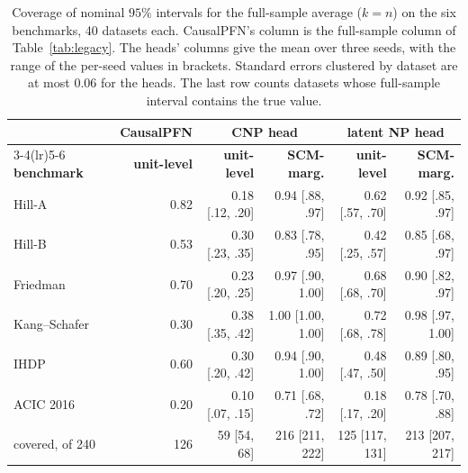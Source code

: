 \begin{table}[tp]
\centering
\footnotesize
\setlength{\tabcolsep}{3pt}
\begin{tabular}{lrrrrr}
\toprule
 & \textbf{CausalPFN} & \multicolumn{2}{c}{\textbf{CNP head}} & \multicolumn{2}{c}{\textbf{latent NP head}} \\
\cmidrule(lr){3-4}\cmidrule(lr){5-6}
\textbf{benchmark} & \textbf{unit-level} & \textbf{unit-level} & \textbf{SCM-marg.} & \textbf{unit-level} & \textbf{SCM-marg.} \\
\midrule
Hill-A & 0.82 & 0.18 {\scriptsize[.12, .20]} & 0.94 {\scriptsize[.88, .97]} & 0.62 {\scriptsize[.57, .70]} & 0.92 {\scriptsize[.85, .97]} \\
Hill-B & 0.53 & 0.30 {\scriptsize[.23, .35]} & 0.83 {\scriptsize[.78, .95]} & 0.42 {\scriptsize[.25, .57]} & 0.85 {\scriptsize[.68, .97]} \\
Friedman & 0.70 & 0.23 {\scriptsize[.20, .25]} & 0.97 {\scriptsize[.90, 1.00]} & 0.68 {\scriptsize[.68, .70]} & 0.90 {\scriptsize[.82, .97]} \\
Kang--Schafer & 0.30 & 0.38 {\scriptsize[.35, .42]} & 1.00 {\scriptsize[1.00, 1.00]} & 0.72 {\scriptsize[.68, .78]} & 0.98 {\scriptsize[.97, 1.00]} \\
IHDP & 0.60 & 0.30 {\scriptsize[.20, .42]} & 0.94 {\scriptsize[.90, 1.00]} & 0.48 {\scriptsize[.47, .50]} & 0.89 {\scriptsize[.80, .95]} \\
ACIC 2016 & 0.20 & 0.10 {\scriptsize[.07, .15]} & 0.71 {\scriptsize[.68, .72]} & 0.18 {\scriptsize[.17, .20]} & 0.78 {\scriptsize[.70, .88]} \\
\addlinespace[2pt]
covered, of 240 & 126 & 59 {\scriptsize[54, 68]} & 216 {\scriptsize[211, 222]} & 125 {\scriptsize[117, 131]} & 213 {\scriptsize[207, 217]} \\
\bottomrule
\end{tabular}
\caption{Coverage of nominal $95\%$ intervals for the full-sample average ($k=n$) on the six benchmarks, 40 datasets each. CausalPFN's column is the full-sample column of Table~\ref{tab:legacy}. The heads' columns give the mean over three seeds, with the range of the per-seed values in brackets. Standard errors clustered by dataset are at most $0.06$ for the heads. The last row counts datasets whose full-sample interval contains the true value.}
\label{tab:heads-coverage}
\end{table}
